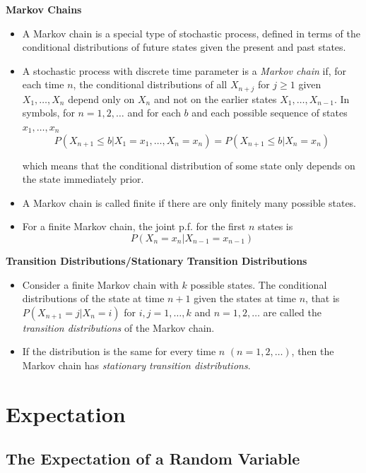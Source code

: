 \documentclass[11pt]{article}
\begin{document}
\textbf{Markov Chains}
\begin{itemize}
    \item A Markov chain is a special type of stochastic process, defined in terms of the 
    conditional distributions of future states given the present and past states. 
    \item A stochastic process with discrete time parameter is a \textit{Markov chain} if, for
    each time $n$, the conditional distributions of all $X_{n+j}$ for $j \ge 1$ given $X_1, 
    \ldots, X_n$ depend only on $X_n$ and not on the earlier states $X_1, \ldots, X_{n-1}$. In 
    symbols, for $n=1, 2, \ldots$ and for each $b$ and each possible sequence of states $x_1, 
    \ldots, x_n$ 
    \[ P(X_{n+1} \le b | X_1=x_1, \ldots, X_n=x_n) = P(X_{n+1} \le b | X_n = x_n)\]

    which means that the conditional distribution of some state only depends on the state 
    immediately prior. 
    \item A Markov chain is called finite if there are only finitely many possible states. 
    \item For a finite Markov chain, the joint p.f. for the first $n$ states is 
    \[ P(X_n=x_n | X_{n-1}= x_{n-1}) \]
\end{itemize}

\textbf{Transition Distributions/Stationary Transition Distributions}
\begin{itemize}
    \item Consider a finite Markov chain with $k$ possible states. The conditional 
    distributions of the state at time $n+1$ given the states at time $n$, that is $P(X_{n+1}
    = j | X_n = i)$ for $i,j = 1, \ldots, k$ and $n = 1, 2, \ldots$ are called the \textit{
    transition distributions} of the Markov chain. 
    \item If the distribution is the same for every time $n$ $(n=1, 2, \ldots)$, then the 
    Markov chain has \textit{stationary transition distributions}.
\end{itemize}

\section{Expectation}

\subsection{The Expectation of a Random Variable}
\end{document}
